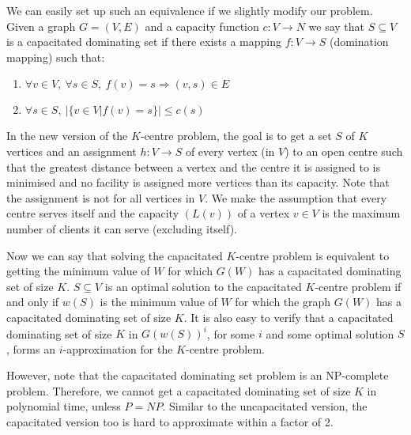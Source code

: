 \documentclass[12pt,a4paper,onecolumn]{article}
\begin{document}
We can easily set up such an equivalence if we slightly modify our problem. Given a graph $G = (V,E)$ and a capacity function $c : V \rightarrow N$ we say that $S \subseteq V$ is a capacitated dominating set if there exists a mapping $f : V \rightarrow S$ (domination mapping) such that:\begin{enumerate}

\item $\forall v \in V ,\:\forall s \in S,\:f(v) = s \Longrightarrow (v,s) \in E$\\ \item $\forall s \in S,\:| \{ v \in V| f(v) = s \} | \leq c(s)$
\end{enumerate}In the new version of the $K$-centre problem, the goal is to get a set $S$ of $K$ vertices and an assignment $h : V \rightarrow S$ of every vertex (in $V$) to an open centre such that the greatest distance between a vertex and the centre it is assigned to is minimised and no facility is assigned more vertices than its capacity. Note that the assignment is not for all vertices in $V$. We make the assumption that every centre serves itself and the capacity $(L(v))$ of a vertex $v \in V$ is the maximum number of clients it can serve (excluding itself). 

Now we can say that solving the capacitated $K$-centre problem is equivalent to getting the minimum value of $W$ for which $G(W)$ has a capacitated dominating set of size $K$. 
$S \subseteq V$ is an optimal solution to the capacitated $K$-centre problem if and only if $w(S)$ is the minimum value of $W$ for which the graph $G(W)$ has a capacitated dominating set of size $K$.
It is also easy to verify that a capacitated dominating set of size $K$ in $G(w(S))^i$, for some $i$ and some optimal solution $S$, forms an $i$-approximation for the $K$-centre problem.

However, note that the capacitated dominating set problem is an NP-complete problem. Therefore, we cannot get a capacitated dominating set of size $K$ in polynomial time, unless $P = NP$. Similar to the uncapacitated version, the capacitated version too is hard to approximate within a factor of 2.
\end{document}

